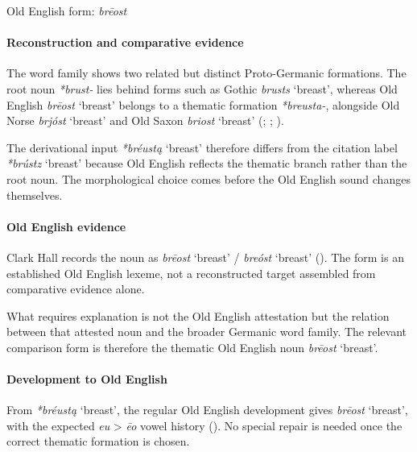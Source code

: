 \documentclass[
  british,
  a4paper,
]{article}
\providecommand{\Recon}[1]{\emph{*#1}}
\begin{document}
Old English form: \emph{brēost}

\paragraph{Reconstruction and comparative
evidence}\label{reconstruction-and-comparative-evidence-92}

The word family shows two related but distinct Proto-Germanic
formations. The root noun {\emph{*brust-}} lies behind forms such as
Gothic {\emph{brusts}} `breast', whereas Old English {\emph{brēost}}
`breast' belongs to a thematic formation {\emph{*breusta-}}, alongside
Old Norse {\emph{brjóst}} `breast' and Old Saxon {\emph{briost}}
`breast' (;
;
).

The derivational input \Recon{bréustą} `breast' therefore differs from
the citation label \Recon{brústz} `breast' because Old English reflects
the thematic branch rather than the root noun. The morphological choice
comes before the Old English sound changes themselves.

\paragraph{Old English evidence}\label{old-english-evidence-94}

Clark Hall records the noun as {\emph{brēost}} `breast' /
{\emph{breóst}} `breast' (). The form is an established Old English lexeme, not a reconstructed
target assembled from comparative evidence alone.

What requires explanation is not the Old English attestation but the
relation between that attested noun and the broader Germanic word
family. The relevant comparison form is therefore the thematic Old
English noun {\emph{brēost}} `breast'.

\paragraph{Development to Old
English}\label{development-to-old-english-92}

From \Recon{bréustą} `breast', the regular Old English development gives
{\emph{brēost}} `breast', with the expected \emph{eu} \textgreater{}
\emph{ēo} vowel history (). No special repair is needed once the correct thematic
formation is chosen.
\end{document}
